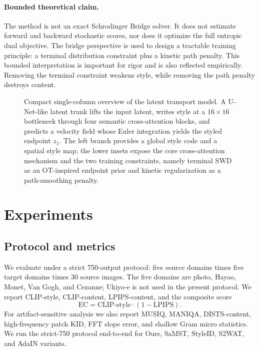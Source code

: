 ﻿\documentclass[letterpaper]{article}
\begin{document}
\paragraph{Bounded theoretical claim.}
The method is not an exact Schrodinger Bridge solver. It does not estimate forward and backward stochastic scores, nor does it optimize the full entropic dual objective. The bridge perspective is used to design a tractable training principle: a terminal distribution constraint plus a kinetic path penalty. This bounded interpretation is important for rigor and is also reflected empirically. Removing the terminal constraint weakens style, while removing the path penalty destroys content.

\begin{figure}[t]
    \centering
    
    \caption{Compact single-column overview of the latent transport model. A U-Net-like latent trunk lifts the input latent, writes style at a $16\times16$ bottleneck through four semantic cross-attention blocks, and predicts a velocity field whose Euler integration yields the styled endpoint $z_1$. The left branch provides a global style code and a spatial style map; the lower insets expose the core cross-attention mechanism and the two training constraints, namely terminal SWD as an OT-inspired endpoint prior and kinetic regularization as a path-smoothing penalty.}
    \label{fig:framework}
\end{figure}

\section{Experiments}
\subsection{Protocol and metrics}
We evaluate under a strict 750-output protocol: five source domains times five target domains times 30 source images. The five domains are photo, Hayao, Monet, Van Gogh, and Cezanne; Ukiyo-e is not used in the present protocol. We report CLIP-style, CLIP-content, LPIPS-content, and the composite score
\begin{equation}
    \mathrm{EC} = \mathrm{CLIP\mbox{-}style}\cdot(1-\mathrm{LPIPS}).
\end{equation}
For artifact-sensitive analysis we also report MUSIQ, MANIQA, DISTS-content, high-frequency patch KID, FFT slope error, and shallow Gram micro statistics. We run the strict-750 protocol end-to-end for Ours, SaMST, StyleID, S2WAT, and AdaIN variants.
\end{document}
